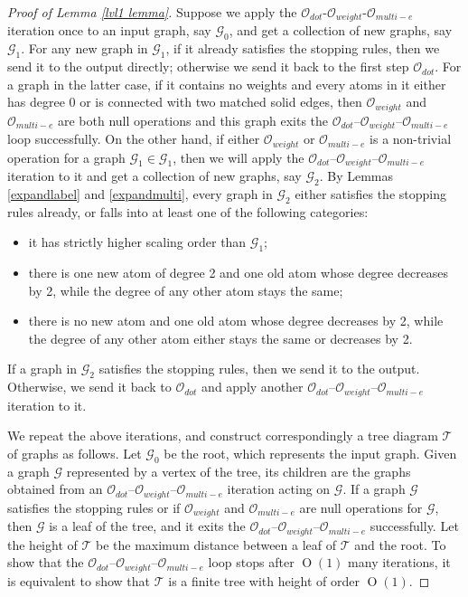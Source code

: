 \documentclass{article}
\newcommand{\1}{\mathds{1}}
\numberwithin{equation}{section}
\renewcommand{\cal}{\mathcal}
\DeclareMathOperator{\OO}{O}
\theoremstyle{plain} %
\theoremstyle{remark}
\newcommand{\cor}{\color{red}}
\begin{document}
\begin{proof}[Proof of Lemma \ref{lvl1 lemma}]
 
\noindent{\bf The $\cal O_{dot}$--${\cal O}_{weight}$--$\cal O_{multi-e}$ loop.} Suppose we apply the $\cal O_{dot}$-${\cal O}_{weight}$-$\cal O_{multi-e}$ iteration once to an input graph, say $\cal G_0$, and get a collection of new graphs, say $\mathscr G_1$. For any new graph in $\mathscr G_1$, if it already satisfies the stopping rules, then we send it to the output directly; otherwise we send it back to the first step $\cal O_{dot}$. For a graph in the latter case, %
if it contains no weights and every atoms in it either has degree 0 or is connected with two matched solid edges, then ${\cal O}_{weight}$ and $\cal O_{multi-e}$ are both null operations and this graph exits the $\cal O_{dot}$--${\cal O}_{weight}$--$\cal O_{multi-e}$ loop successfully. On the other hand, if either ${\cal O}_{weight}$ or $\cal O_{multi-e}$ is a non-trivial operation for a graph $\cal G_1\in \mathscr  G_1$, then we will apply the $\cal O_{dot}$--${\cal O}_{weight}$--$\cal O_{multi-e}$ iteration to it and get a collection of new graphs, say $\mathscr G_2 $. By Lemmas \ref{expandlabel} and \ref{expandmulti}, every graph in $\mathscr G_2 $ either satisfies the stopping rules already, or falls into at least one of the following categories: 
\begin{itemize}
\item[(1)] it has strictly higher scaling order than $\cal G_1$; 
\item[(2)] there is one new atom of degree 2 and one old atom whose degree decreases by 2, while the degree of any other atom stays the same;
\item[(3)] there is no new atom and one old atom whose degree decreases by 2, while the degree of any other atom either stays the same or decreases by 2. 
\end{itemize}
If a graph in $\mathscr G_2$ satisfies the stopping rules, then we send it to the output. Otherwise, we send it back to $\cal O_{dot}$ and apply another $\cal O_{dot}$--${\cal O}_{weight}$--$\cal O_{multi-e}$ iteration to it.


We repeat the above iterations, and construct correspondingly a tree diagram $\cal T$ of graphs as follows. Let $\cal G_0$ be the root, which represents the input graph. Given a graph $\cal G$ represented by a vertex of the tree, its children are the graphs obtained from an $\cal O_{dot}$--${\cal O}_{weight}$--$\cal O_{multi-e}$ iteration acting on $\cal G$. If a graph $\cal G$ satisfies the stopping rules or if ${\cal O}_{weight}$ and $\cal O_{multi-e}$ are null operations for $\cal G$, then $\cal G$ is a leaf of the tree, and it exits the $\cal O_{dot}$--${\cal O}_{weight}$--$\cal O_{multi-e}$ successfully. Let the height of $\cal T$ be the maximum distance between a leaf of $\cal T$ and the root. To show that the $\cal O_{dot}$--${\cal O}_{weight}$--$\cal O_{multi-e}$ loop stops after $\OO(1)$ many iterations, it is equivalent to show that $\cal T$ is a finite tree with height of order $\OO(1)$. %


\end{proof}
\end{document}
